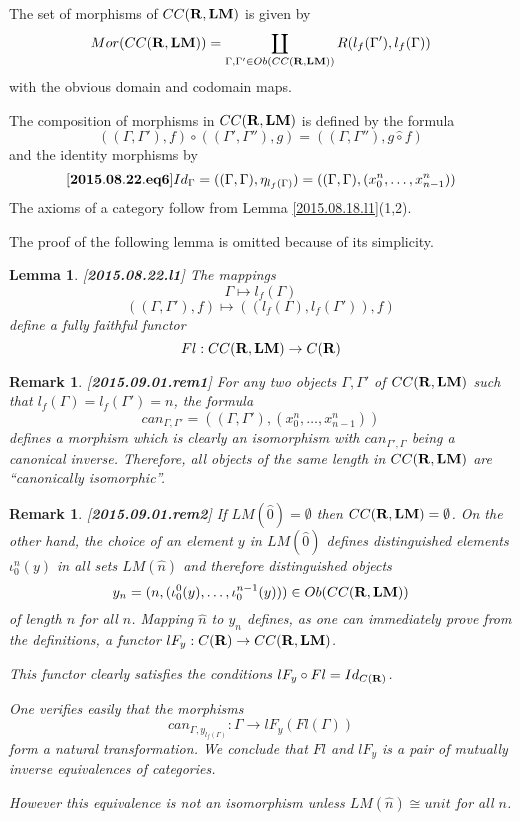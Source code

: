 \documentclass[11pt]{article}
\newenvironment{eq}{\begin{equation}}{\end{equation}}
\newtheorem{lemma}[proposition]{Lemma}
\newtheorem{remark}[proposition]{Remark}
\newcommand{\llabel}[1]{\label{#1}[{\bf #1}]}
\newcommand{\sr}{\rightarrow}
\newcommand{\rr}{{\bf R}}
\newcommand{\lm}{{\bf LM}}
\newcommand{\wh}{\widehat}
\newcommand{\hc}{\wh{\circ}}
\begin{document}
The set of morphisms of $CC(\rr,\lm)$ is given by
%
$$Mor(CC(\rr,\lm))=\coprod_{\Gamma,\Gamma'\in Ob(CC(\rr,\lm))} R(l_f(\Gamma'),l_f(\Gamma))$$
%
with the obvious domain and codomain maps. 

The composition of morphisms in $CC(\rr,\lm)$ is defined by the formula
%
$$((\Gamma,\Gamma'),f)\circ ((\Gamma',\Gamma''),g)=((\Gamma,\Gamma''), g\hc f)$$
%
and the identity morphisms by
%
\begin{eq}\llabel{2015.08.22.eq6}
Id_{\Gamma}=((\Gamma,\Gamma), \eta_{l_f(\Gamma)})=((\Gamma,\Gamma),(x^n_0,\dots,x^n_{n-1}))
\end{eq}
%
The axioms of a category follow from Lemma \ref{2015.08.18.l1}(1,2). 


The proof of the following lemma is omitted because of its simplicity.
%
\begin{lemma}
\llabel{2015.08.22.l1}
The mappings 
%
$$\Gamma\mapsto l_f(\Gamma)$$
$$((\Gamma,\Gamma'),f)\mapsto ((l_f(\Gamma),l_f(\Gamma')),f)$$
%
define a fully faithful functor 
%
$$Fl:CC(\rr,\lm)\sr C(\rr)$$
%
\end{lemma}
%
\begin{remark}\rm
\llabel{2015.09.01.rem1}
For any two objects $\Gamma,\Gamma'$ of $CC(\rr,\lm)$ such that $l_f(\Gamma)=l_f(\Gamma')=n$, the formula
%
$$can_{\Gamma,\Gamma'}=((\Gamma,\Gamma'),(x_0^n,\dots,x_{n-1}^n))$$
%
defines a morphism which is clearly an isomorphism with $can_{\Gamma',\Gamma}$ being a canonical inverse. Therefore, all objects of the same length in $CC(\rr,\lm)$ are ``canonically isomorphic''. 
\end{remark}
%
\begin{remark}\rm
\llabel{2015.09.01.rem2}
If $LM(\wh{0})=\emptyset$ then $CC(\rr,\lm)=\emptyset$. On the other hand, the choice of an element $y$ in $LM(\wh{0})$ defines distinguished elements $\iota_0^n(y)$ in all sets $LM(\wh{n})$ and therefore distinguished objects 
%
$$y_n=(n,(\iota_0^0(y),\dots,\iota_0^{n-1}(y)))\in Ob(CC(\rr,\lm))$$
%
of length $n$ for all $n$. Mapping $\wh{n}$ to $y_n$ defines, as one can immediately prove from the definitions, a functor $lF_{y}:C(\rr)\sr CC(\rr,\lm)$. 

This functor clearly satisfies the conditions $lF_{y}\circ Fl=Id_{C(\rr)}$.

One verifies easily that the morphisms 
%
$$can_{\Gamma,y_{l_f(\Gamma)}}:\Gamma\sr lF_{y}(Fl(\Gamma))$$
%
form a natural transformation. We conclude that $Fl$ and $lF_{y}$ is a pair of mutually inverse equivalences of categories.

However this equivalence is not an isomorphism unless $LM(\wh{n})\cong unit$ for all $n$.
\end{remark}
%
\end{document}
